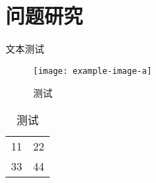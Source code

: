 \chapter{问题研究}

文本测试

\begin{figure}[htbp]
  \centering
  \texttt{[image: example-image-a]}
  \caption{测试}
  \label{figure:test2}
\end{figure}

\begin{table}[htbp]
  \centering
  \caption{测试}
  \label{table:test2}
  \begin{tabular}{|c|c|}
    11 & 22 \\
    33 & 44 
  \end{tabular}
\end{table}
